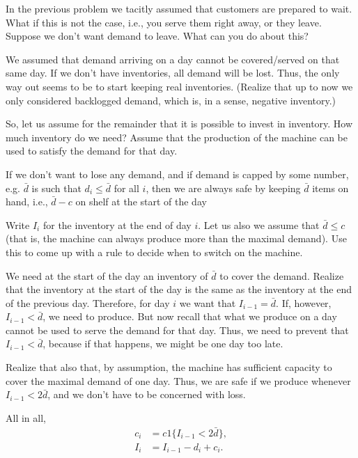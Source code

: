 \begin{question}
  In the previous problem we tacitly assumed that customers are
  prepared to wait.  What if this is not the case, i.e., you serve
  them right away, or they leave. Suppose we don't want demand to
  leave. What can you do about this?
  \begin{solution}
    We assumed that demand arriving on a day cannot be covered/served
    on that same day. If we don't have inventories, all demand will be
    lost. Thus, the only way out seems to be to start keeping real
    inventories. (Realize that up to now we only considered backlogged
    demand, which is, in a sense, negative inventory.) 
  \end{solution}
\end{question}

\begin{question}
  So, let us assume for the remainder that it is possible to invest in
  inventory. How much inventory do we need? Assume that the production
  of the machine can be used to satisfy the demand for that day. 
  \begin{solution}
    If we don't want to lose any demand, and if demand is capped by
    some number, e.g.  $\bar d$ is such that $d_i \leq \bar d$ for all
    $i$, then we are always safe by keeping $\bar d$ items on hand,
    i.e., $\bar d-c$ on shelf at the start of the day
  \end{solution}
\end{question}

\begin{question}
  Write $I_i$ for the inventory at the end of day $i$.  
  Let us also we assume that $\bar d \leq c$ (that is, the machine can
  always produce more than the maximal demand).  Use this to come up
  with a rule to decide when to switch on the machine.
  \begin{solution}
    We need at the start of the day an inventory of $\bar d$ to cover
    the demand. Realize that the inventory at the start of the day is
    the same as the inventory at the end of the previous
    day. Therefore, for day $i$ we want that $I_{i-1} = \bar d$. If,
    however, $I_{i-1}<\bar d$, we need to produce. But now recall that
    what we produce on a day cannot be used to serve the demand for
    that day.  Thus, we need to prevent that $I_{i-1}<\bar d$, because
    if that happens, we might be one day too late.

    Realize that also that, by assumption, the machine has sufficient
    capacity to cover the maximal demand of one day. Thus, we are safe
    if we produce whenever $I_{i-1} <2 \bar d$, and we don't have to
    be concerned with loss.  

All in all, 
    \begin{align*}
      c_i &= c1\{I_{i-1}< 2\bar d\}, \\
      I_i &= I_{i-1} -d_i + c_i. 
    \end{align*}
  \end{solution}
\end{question}

